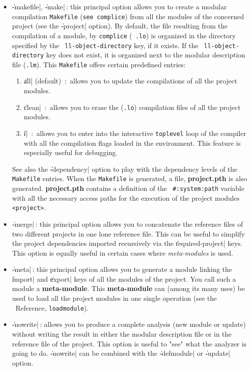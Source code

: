 \begin{itemize}
\item {\Large \|-makefile|, \|-make|}\,: this principal option allows you to create a modular compilation {\tt Makefile}  ({\tt see complice}) from all the modules of the concerned project (see the \|-project| option).  By default, the file resulting from the compilation of a module, by {\tt complice} ({\tt
.lo}) is organized in the directory specified by the {\tt
ll-object-directory} key, if it exists.  If the {\tt
ll-object-directory} key does not exist, it is organized next to the modular description file  ({\tt .lm}).
This {\tt Makefile} offers certain predefined entries: 
\begin {enumerate}
\item \|all| (default)\ :\ 
allows you to update the compilations of all the project modules.
\item \|clean|\ :\ 
allows you to erase the ({\tt .lo}) compilation files of all the project modules.
\item \|i|\ :\ 
allows you to enter into the interactive {\tt toplevel} loop of the compiler with all the compilation flags loaded in the environment.  This feature is especially useful for debugging.
\end{enumerate}
See also the \|-dependency| option to play with the dependency levels of the {\tt Makefile} entries.
When the {\tt Makefile} is generated, a file, {\bf
project.pth} is also generated. {\bf
project.pth} contains a definition of the {\tt
\#:system:path} variable with all the necessary access paths for the execution of the project modules {\tt <project>}.

\item {\Large \|-merge|}\,: this principal option allows you to concatenate the reference files of two different projects in one lone reference file.  This can be useful to simplify the project dependencies imported recursively via the \|required-project| keys. 
This option is equally useful in certain cases where {\em meta-modules} is used.

\item {\Large \|-meta|}\,: this principal option allows you to generate a module linking the \|import| and \|export| keys of all the modules of the project.
You call such a module a {\bf
meta-module}.  This {\bf
meta-module} can (among its many uses) be used to load all the project modules in one single operation (see the  \LeLisp\ Reference, {\tt loadmodule}).

\item {\Large \|-nowrite|}\,: 
allows you to produce a complete analysis (new module or update) without writing the result in either the modular description file or in the reference file of the project.  This option is useful to "see" what the analyzer is going to do.
\|-nowrite| can be combined with the \|-defmodule| or \|-update| option.


\end{itemize}
